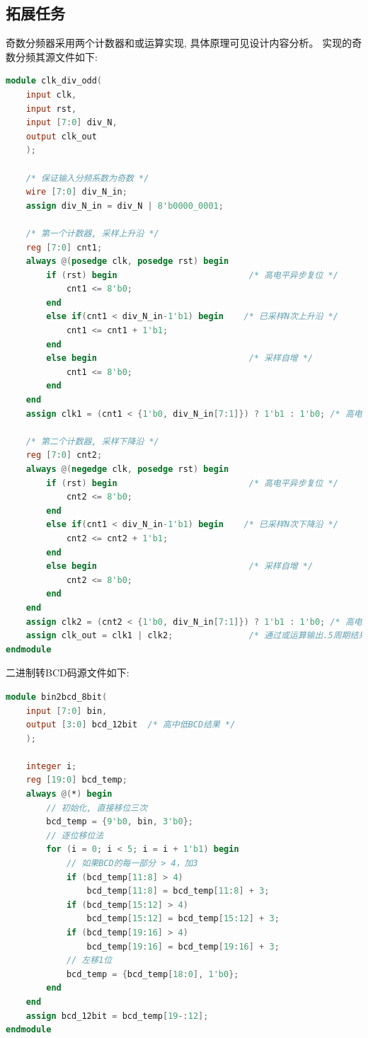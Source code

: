 \documentclass{article}
\begin{document}
\subsection*{拓展任务}
奇数分频器采用两个计数器和或运算实现, 具体原理可见设计内容分析。
实现的奇数分频其源文件如下:
\begin{lstlisting}[language=Verilog, caption={通用奇数分频器设计源文件}]
module clk_div_odd(
    input clk,
    input rst,
    input [7:0] div_N,
    output clk_out
    );

    /* 保证输入分频系数为奇数 */
    wire [7:0] div_N_in;
    assign div_N_in = div_N | 8'b0000_0001;

    /* 第一个计数器, 采样上升沿 */
    reg [7:0] cnt1;
    always @(posedge clk, posedge rst) begin
        if (rst) begin                          /* 高电平异步复位 */
            cnt1 <= 8'b0;
        end
        else if(cnt1 < div_N_in-1'b1) begin    /* 已采样N次上升沿 */
            cnt1 <= cnt1 + 1'b1;
        end
        else begin                              /* 采样自增 */
            cnt1 <= 8'b0;
        end
    end
    assign clk1 = (cnt1 < {1'b0, div_N_in[7:1]}) ? 1'b1 : 1'b0; /* 高电平比低电平多1个周期 */
    
    /* 第二个计数器, 采样下降沿 */
    reg [7:0] cnt2;
    always @(negedge clk, posedge rst) begin
        if (rst) begin                          /* 高电平异步复位 */
            cnt2 <= 8'b0;
        end
        else if(cnt1 < div_N_in-1'b1) begin    /* 已采样N次下降沿 */
            cnt2 <= cnt2 + 1'b1;
        end
        else begin                              /* 采样自增 */
            cnt2 <= 8'b0;
        end
    end
    assign clk2 = (cnt2 < {1'b0, div_N_in[7:1]}) ? 1'b1 : 1'b0; /* 高电平比低电平多一个周期 */
    assign clk_out = clk1 | clk2;               /* 通过或运算输出.5周期结果 */
endmodule
\end{lstlisting}
二进制转BCD码源文件如下:
\begin{lstlisting}[language=Verilog, caption={二进制转BCD码}]
module bin2bcd_8bit(
    input [7:0] bin, 
    output [3:0] bcd_12bit  /* 高中低BCD结果 */
    );

    integer i;
    reg [19:0] bcd_temp;
    always @(*) begin
        // 初始化, 直接移位三次
        bcd_temp = {9'b0, bin, 3'b0};
        // 逐位移位法
        for (i = 0; i < 5; i = i + 1'b1) begin
            // 如果BCD的每一部分 > 4，加3
            if (bcd_temp[11:8] > 4)
                bcd_temp[11:8] = bcd_temp[11:8] + 3;
            if (bcd_temp[15:12] > 4)
                bcd_temp[15:12] = bcd_temp[15:12] + 3;
            if (bcd_temp[19:16] > 4)
                bcd_temp[19:16] = bcd_temp[19:16] + 3;
            // 左移1位
            bcd_temp = {bcd_temp[18:0], 1'b0};
        end
    end
    assign bcd_12bit = bcd_temp[19-:12];
endmodule
\end{lstlisting}
\end{document}

